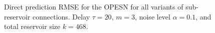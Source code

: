\begin{figure}[h]
    \centering
    \caption{Direct prediction RMSE for the OPESN for all variants of sub-reservoir connections. Delay $\tau=20$, $m=3$, noise level $\alpha=0.1$, and total reservoir size $k=468$.}
    \label{fig:OPESN_direct_sub_reservoir_connections_m_3}
\end{figure}